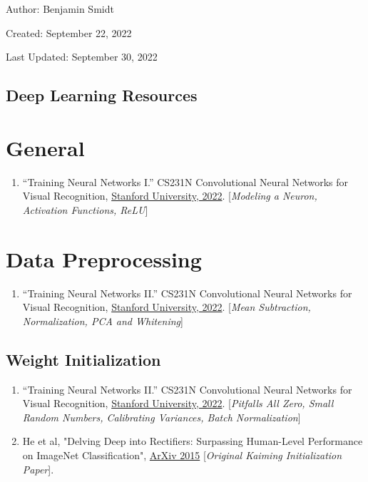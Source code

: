 \documentclass[12pt]{article}
\begin{document}
\noindent Author: Benjamin Smidt

\noindent Created: September 22, 2022

\noindent Last Updated: September 30, 2022
\begin{center}
\section*{Deep Learning Resources}
\end{center}

\tableofcontents{}

\newpage

\section{General}
\begin{enumerate}
    \item “Training Neural Networks I.” 
    CS231N Convolutional Neural Networks for Visual Recognition, 
    \href{https://cs231n.github.io/neural-networks-1/#intro}{Stanford University, 2022}.
    [\emph{Modeling a Neuron, Activation Functions, ReLU}]
\end{enumerate}

\section{Data Preprocessing}
\begin{enumerate}
    \item “Training Neural Networks II.” 
    CS231N Convolutional Neural Networks for Visual Recognition, 
    \href{https://cs231n.github.io/neural-networks-2/#datapre}{Stanford University, 2022}. 
    [\emph{Mean Subtraction, Normalization, PCA and Whitening}]
\end{enumerate}

\subsection{Weight Initialization}
\begin{enumerate}
    \item “Training Neural Networks II.” 
    CS231N Convolutional Neural Networks for Visual Recognition, 
    \href{https://cs231n.github.io/neural-networks-2/#init}{Stanford University, 2022}. 
    [\emph{Pitfalls All Zero, Small Random Numbers, Calibrating Variances, 
    Batch Normalization}]
    \item He et al, "Delving Deep into Rectifiers: Surpassing Human-Level 
    Performance on ImageNet Classification", 
    \href{https://arxiv.org/abs/1502.01852v1}{ArXiv 2015}
    [\emph{Original Kaiming Initialization Paper}]. 
\end{enumerate}
\end{document}
